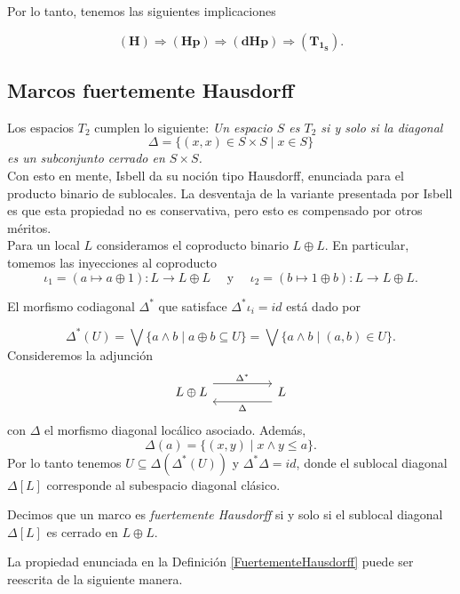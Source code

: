 Por lo tanto, tenemos las siguientes implicaciones

\[
\mathbf{(H)}\Rightarrow \mathbf{(Hp)}\Rightarrow \mathbf{(dHp)}\Rightarrow \mathbf{(T_{1_S})}.
\]

\subsection{Marcos fuertemente Hausdorff}

Los espacios $T_2$ cumplen lo siguiente: \emph{Un espacio $S$ es $T_2$ si y solo si la diagonal 
\[
\Delta=\{(x,x)\in S\times S\mid x\in S\}
\]
es un subconjunto cerrado en $S\times S$.}\\

Con esto en mente, Isbell da su noción tipo Hausdorff, enunciada para el producto binario de sublocales. La desventaja de la variante presentada por Isbell es que esta propiedad no es conservativa, pero esto es compensado por otros méritos.\\

Para un local $L$ consideramos el coproducto binario $L\oplus L$. En particular, tomemos las inyecciones al coproducto
\[
\iota_1=(a\mapsto a\oplus 1)\colon L\to L\oplus L\quad \mbox{ y }\quad \iota_2=(b\mapsto 1\oplus b)\colon L\to L\oplus L.
\]

El morfismo codiagonal $\Delta^*$ que satisface $\Delta^*\iota_i=id$ está dado por

\[
\Delta^*(U)=\bigvee\{a\wedge b\mid a\oplus b\subseteq U\}=\bigvee\{a\wedge b\mid (a, b)\in U\}. 
\]
Consideremos la adjunción
\[\begin{tikzcd}
	{L\oplus L} && L
	\arrow["{\Delta^*}", shift left=3, from=1-1, to=1-3]
	\arrow["\Delta", shift left=3, from=1-3, to=1-1]
\end{tikzcd}\]
con $\Delta$ el morfismo diagonal locálico asociado. Además, 
\[
\Delta(a)=\{(x, y)\mid x\wedge y\leq a\}.
\]
Por lo tanto tenemos $U\subseteq \Delta(\Delta^*(U))$ y $\Delta^*\Delta=id$, donde el sublocal diagonal $\Delta[L]$ corresponde al subespacio diagonal clásico.

\begin{dfn}\label{FuertementeHausdorff}
    Decimos que un marco es \emph{fuertemente Hausdorff} si y solo si el sublocal diagonal $\Delta[L]$ es cerrado en $L\oplus L$.
\end{dfn}

La propiedad enunciada en la Definición \ref{FuertementeHausdorff} puede ser reescrita de la siguiente manera.

